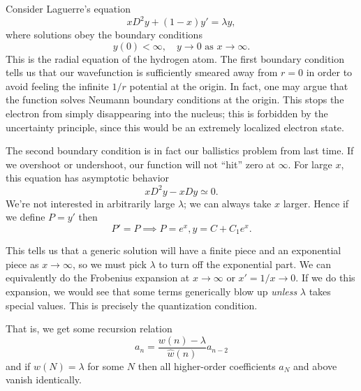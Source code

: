 \begin{exm}
    Consider Laguerre's equation
    \begin{equation}
        xD^2y +(1-x)y' = \lambda y,
    \end{equation}
    where solutions obey the boundary conditions
    \begin{equation}
        y(0) <\infty, \quad y\to 0 \text{ as } x\to\infty.
    \end{equation}
    This is the radial equation of the hydrogen atom. The first boundary condition tells us that our wavefunction is sufficiently smeared away from $r=0$ in order to avoid feeling the infinite $1/r$ potential at the origin. In fact, one may argue that the function solves Neumann boundary conditions at the origin. This stops the electron from simply disappearing into the nucleus; this is forbidden by the uncertainty principle, since this would be an extremely localized electron state.
    
    The second boundary condition is in fact our ballistics problem from last time. If we overshoot or undershoot, our function will not ``hit'' zero at $\infty$. For large $x$, this equation has asymptotic behavior
    \begin{equation}
        xD^2 y - xD y\simeq 0.
    \end{equation}
    We're not interested in arbitrarily large $\lambda$; we can always take $x$ larger. Hence if we define $P=y'$ then
    \begin{equation}
        P'=P \implies P = e^x, y = C + C_1 e^x.
    \end{equation}
    
    This tells us that a generic solution will have a finite piece and an exponential piece as $x\to \infty$, so we must pick $\lambda$ to turn off the exponential part. We can equivalently do the Frobenius expansion at $x\to \infty$ or $x'=1/x \to 0$. If we do this expansion, we would see that some terms generically blow up \emph{unless} $\lambda$ takes special values. This is precisely the quantization condition.
    
    That is, we get some recursion relation
    \begin{equation}
        a_n = \frac{w(n) - \lambda}{\hat w(n)}a_{n-2}
    \end{equation}
    and if $w(N) = \lambda$ for some $N$ then all higher-order coefficients $a_N$ and above vanish identically.
\end{exm}

